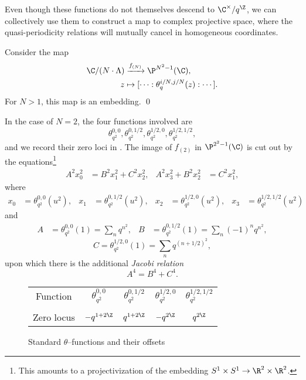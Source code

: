 Even though these functions do not themselves descend to \(\C^\times / q^{\Z}\), we can collectively use them to construct a map to complex projective space, where the quasi-periodicity relations will mutually cancel in homogeneous coordinates.
\begin{theorem}
Consider the map
\begin{align*}
\C / (N \cdot \Lambda) & \xrightarrow{f_{(N)}} \P^{N^2-1}(\C), \\
z & \mapsto [\cdots : \theta_q^{i/N, j/N}(z) : \cdots].
\end{align*}
For \(N > 1\), this map is an embedding. \qed
\end{theorem}

\begin{example}
In the case of \(N = 2\), the four functions involved are \[\theta_{q^2}^{0,0}, \theta_{q^2}^{0,1/2}, \theta_{q^2}^{1/2,0}, \theta_{q^2}^{1/2,1/2},\] and we record their zero loci in .  The image of \(f_{(2)}\) in \(\P^{2^2 - 1}(\C)\) is cut out by the equations\footnote{This amounts to a projectivization of the embedding \(S^1 \times S^1 \to \R^2 \times \R^2\).}
\begin{align*}
A^2 x_0^2 & = B^2 x_1^2 + C^2 x_2^2, &
A^2 x_3^2 + B^2 x_2^2 & = C^2 x_1^2,
\end{align*}
where
\begin{align*}
x_0 & = \theta_{q^2}^{0, 0}(u^2), &
x_1 & = \theta_{q^2}^{0, 1/2}(u^2), &
x_2 & = \theta_{q^2}^{1/2, 0}(u^2), &
x_3 & = \theta_{q^2}^{1/2, 1/2}(u^2)
\end{align*}
and
\begin{align*}
A & = \theta_{q^2}^{0, 0}(1) = \sum_n q^{n^2}, &
B & = \theta_{q^2}^{0, 1/2}(1) = \sum_n (-1)^n q^{n^2},
\end{align*}
\[C = \theta_{q^2}^{1/2, 0}(1) = \sum_n q^{(n + 1/2)^2},\]
upon which there is the additional \textit{Jacobi relation} \[A^4 = B^4 + C^4.\]
\end{example}

\begin{figure}
\begin{center}
\begin{tabular}{@{}ccccc@{}} \toprule
Function & \(\theta_{q^2}^{0,0}\) & \(\theta_{q^2}^{0,1/2}\) & \(\theta_{q^2}^{1/2,0}\) & \(\theta_{q^2}^{1/2,1/2}\) \\ \\
Zero locus & \(-q^{1+2\Z}\) & \(q^{1+2\Z}\) & \(-q^{2\Z}\) & \(q^{2\Z}\) \\
\bottomrule
\end{tabular}
\end{center}
\caption{Standard \(\theta\)--functions and their offsets}\label{ThetaFunctionsTable}
\end{figure}

